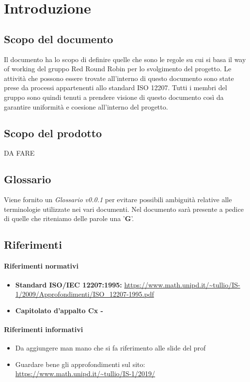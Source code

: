 \section{Introduzione}
	\subsection{Scopo del documento}
		Il documento ha lo scopo di definire quelle che sono le regole su cui si basa il way of working del gruppo Red Round Robin per lo svolgimento del progetto. Le attività che possono essere trovate all'interno di questo documento sono state prese da processi appartenenti allo standard ISO 12207. Tutti i membri del gruppo sono quindi tenuti a prendere visione di questo documento così da garantire uniformità e coesione all'interno del progetto.   
	\subsection{Scopo del prodotto}
		DA FARE
	\subsection{Glossario}
		Viene fornito un \textit{Glossario v0.0.1} per evitare possibili ambiguità relative alle terminologie utilizzate nei vari documenti. Nel documento sarà presente a pedice di quelle che riteniamo delle parole una '\textbf{G}'.
	\subsection{Riferimenti}

		\paragraph{Riferimenti normativi}
			\begin{itemize}
				\item \textbf{Standard ISO/IEC 12207:1995: } 
				\url{https://www.math.unipd.it/~tullio/IS-1/2009/Approfondimenti/ISO_12207-1995.pdf}
				\item \textbf{Capitolato d'appalto Cx -} 
				\url{}
			\end{itemize}	
		\paragraph{Riferimenti informativi}
			\begin{itemize}
				\item Da aggiungere man mano che si fa riferimento alle slide del prof
				\item Guardare bene gli approfondimenti sul sito:
				\url{https://www.math.unipd.it/~tullio/IS-1/2019/} 
			\end{itemize}
		

